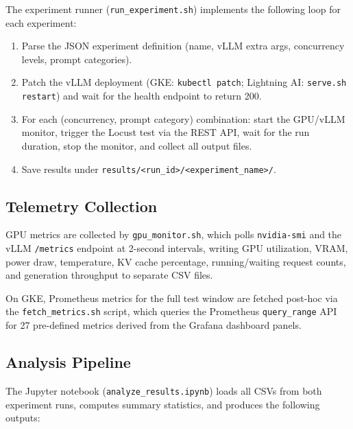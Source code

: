 \documentclass[a4paper,12pt]{report}
\begin{document}
The experiment runner (\texttt{run\_experiment.sh}) implements the following loop for each experiment:

\begin{enumerate}
    \item Parse the JSON experiment definition (name, vLLM extra args, concurrency levels, prompt categories).
    \item Patch the vLLM deployment (GKE: \texttt{kubectl patch}; Lightning AI: \texttt{serve.sh restart}) and wait for the health endpoint to return 200.
    \item For each (concurrency, prompt category) combination: start the GPU/vLLM monitor, trigger the Locust test via the REST API, wait for the run duration, stop the monitor, and collect all output files.
    \item Save results under \texttt{results/<run\_id>/<experiment\_name>/}.
\end{enumerate}

\subsection{Telemetry Collection}

GPU metrics are collected by \texttt{gpu\_monitor.sh}, which polls \texttt{nvidia-smi} and the vLLM \texttt{/metrics} endpoint at 2-second intervals, writing GPU utilization, VRAM, power draw, temperature, KV cache percentage, running/waiting request counts, and generation throughput to separate CSV files.

On GKE, Prometheus metrics for the full test window are fetched post-hoc via the \texttt{fetch\_metrics.sh} script, which queries the Prometheus \texttt{query\_range} API for 27 pre-defined metrics derived from the Grafana dashboard panels.

\subsection{Analysis Pipeline}

The Jupyter notebook (\texttt{analyze\_results.ipynb}) loads all CSVs from both experiment runs, computes summary statistics, and produces the following outputs:
\end{document}
